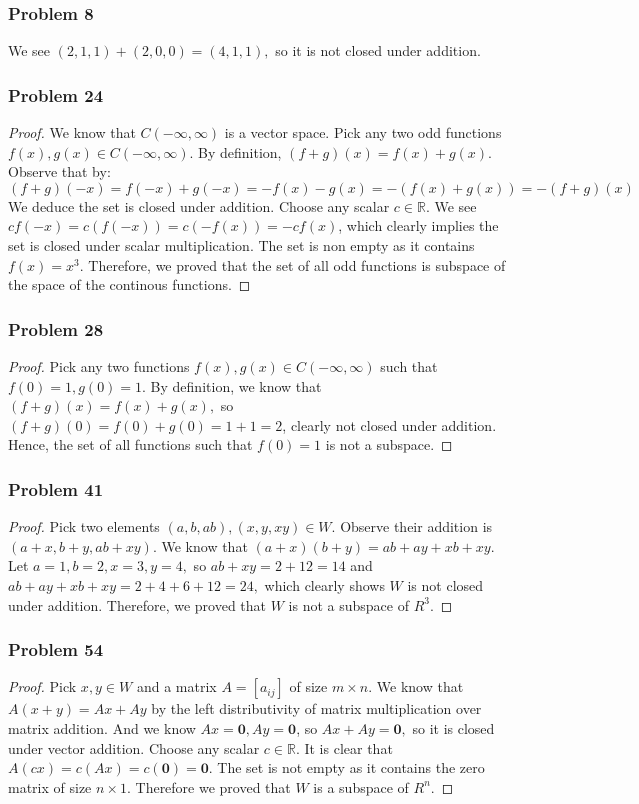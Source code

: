 \documentclass[a4paper,12pt]{article}
\begin{document}
\subsubsection*{Problem 8}
We see $(2,1,1)+(2,0,0)=(4,1,1),$ so it is not closed under addition.
\subsubsection*{Problem 24}
\begin{proof}
    We know that $C(-\infty, \infty)$ is a vector space. Pick any two odd functions $f(x),g(x) \in C(-\infty, \infty)$. By definition, $(f+g)(x)=f(x)+g(x)$. Observe that by: \[(f+g)(-x)=f(-x)+g(-x)=-f(x)-g(x)=-(f(x)+g(x))=-(f+g)(x)\] We deduce the set is closed under addition.
    Choose any scalar $c \in \mathbb{R}$. We see $cf(-x)=c(f(-x))=c(-f(x))=-cf(x)$, which clearly implies the set is closed under scalar multiplication. The set is non empty as it contains $f(x)=x^3.$ Therefore, we proved that the set of all odd functions is subspace of the space of the continous functions.
\end{proof}
\subsubsection*{Problem 28}
\begin{proof}
    Pick any two functions $f(x),g(x) \in C(-\infty, \infty)$ such that $f(0)=1, g(0)=1.$ By definition, we know that $(f+g)(x)=f(x)+g(x),$ so $(f+g)(0)=f(0)+g(0)=1+1=2$, clearly not closed under addition. Hence, the set of all functions such that $f(0)=1$ is not a subspace.
\end{proof}
\subsubsection*{Problem 41}
\begin{proof}
    Pick two elements $(a,b,ab),(x,y,xy)\in W.$ Observe their addition is $(a+x,b+y, ab+xy).$ We know that $(a+x)(b+y)=ab+ay+xb+xy.$ Let $a=1,b=2,x=3,y=4,$ so $ab+xy=2+12=14$ and $ab+ay+xb+xy=2+4+6+12=24,$ which clearly shows $W$ is not closed under addition. Therefore, we proved that $W$ is not a subspace of $R^3.$
\end{proof}
\subsubsection*{Problem 54}
\begin{proof}
Pick $x,y \in W$ and a matrix $A=[a_{ij}]$ of size $m \times n$. We know that $A(x+y) = Ax+Ay$ by the left distributivity of matrix multiplication over matrix addition. And we know $Ax=\textbf{0}, Ay=\textbf{0}$, so $Ax+Ay=\textbf{0},$ so it is closed under vector addition. Choose any scalar $c \in \mathbb{R}.$ It is clear that $A(cx)=c(Ax)=c(\textbf{0})=\textbf{0}.$ The set is not empty as it contains the zero matrix of size $n\times 1$. Therefore we proved that $W$ is a subspace of $R^n.$
\end{proof}
\end{document}
